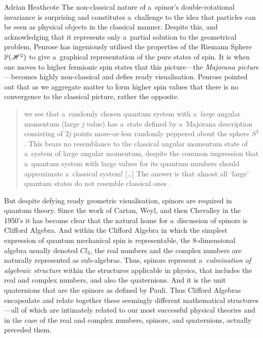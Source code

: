 \begin{artengenv}{Adrian Heathcote}
The non-classical nature of a~spinor's double-rotational invariance is surprising and constitutes a~challenge to the idea that particles can be seen as physical objects in the classical manner. Despite this, and acknowledging that it represents only a~partial solution to the geometrical problem, Penrose has ingeniously utilised the properties of the Riemann Sphere $\mathbb{P}(\mathscr{H}^{2})$ to give a~graphical representation of the pure states of spin. It is when one moves to higher fermionic spin states that this picture---the \textit{Majorana picture}---becomes highly non-classical and defies ready visualisation. Penrose pointed out that as we aggregate matter to form higher spin values that  there is no convergence to the classical picture, rather the opposite. 
\begin{quotation}\noindent
[\ldots] we see that a~randomly chosen quantum system with a~\textit{large} angular momentum (large \textit{j} value) has a~state defined by a~Majorana description consisting of 2\textit{j} points more-or-less randomly peppered about the sphere $S^{2}$. This bears no resemblance to the classical angular momentum state of a~system of large angular momentum, despite the common impression that a~quantum system with large values for its quantum numbers should approximate a~classical system! [\ldots] The answer is that almost all `large' quantum states do not resemble classical ones \parencites[566]{penrose_road_2004_ah}[also see][]{penrose_spinors_1987}{penrose_spinors_1988}.
\end{quotation}

But despite defying ready geometric visualisation, spinors are required in quantum theory. Since the work of Cartan, Weyl, and then Chevalley in the 1950's it has become clear that the natural home for a~discussion of spinors is Clifford Algebra. And within the Clifford Algebra in which the simplest expression of quantum mechanical spin is representable, the 8-dimensional algebra usually denoted $\mathit{Cl}_{3}$, the real numbers and the complex numbers are naturally represented as sub-algebras. Thus, spinors represent a~\textit{culmination of algebraic structure} within the structures applicable in physics, that includes the real and complex numbers, and also the quaternions. And it is the unit quaternions that are the spinors as defined by Pauli. Thus Clifford Algebras encapsulate and relate together these seemingly different mathematical structures---all of which are intimately related to our most successful physical theories and in the case of the real and  complex numbers, spinors, and quaternions, actually preceded them.


\end{artengenv}
